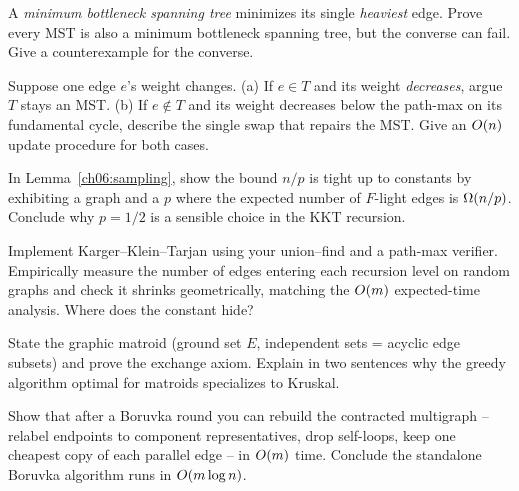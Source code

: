 \begin{exercise}
A \emph{minimum bottleneck spanning tree} minimizes its single \emph{heaviest} edge. Prove every MST is also a minimum bottleneck spanning tree, but the converse can fail. Give a counterexample for the converse.
\end{exercise}

\begin{exercise}
Suppose one edge $e$'s weight changes. (a) If $e\in T$ and its weight \emph{decreases}, argue $T$ stays an MST. (b) If $e\notin T$ and its weight decreases below the path-max on its fundamental cycle, describe the single swap that repairs the MST. Give an $O(n)$ update procedure for both cases.
\end{exercise}

\begin{exercise}
In Lemma~\ref{ch06:sampling}, show the bound $n/p$ is tight up to constants by exhibiting a graph and a $p$ where the expected number of $F$-light edges is $\Omega(n/p)$. Conclude why $p=1/2$ is a sensible choice in the KKT recursion.
\end{exercise}

\begin{exercise}
Implement Karger--Klein--Tarjan using your union--find and a path-max verifier. Empirically measure the number of edges entering each recursion level on random graphs and check it shrinks geometrically, matching the $O(m)$ expected-time analysis. Where does the constant hide?
\end{exercise}

\begin{exercise}
State the graphic matroid (ground set $E$, independent sets = acyclic edge subsets) and prove the exchange axiom. Explain in two sentences why the greedy algorithm optimal for matroids specializes to Kruskal.
\end{exercise}

\begin{exercise}
Show that after a Boruvka round you can rebuild the contracted multigraph -- relabel endpoints to component representatives, drop self-loops, keep one cheapest copy of each parallel edge -- in $O(m)$ time. Conclude the standalone Boruvka algorithm runs in $O(m\log n)$.
\end{exercise}
